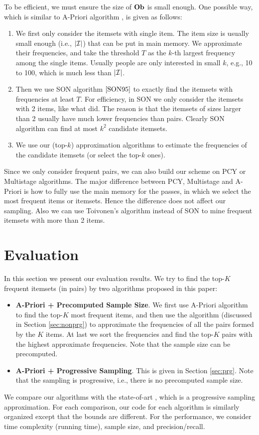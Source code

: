 \documentclass{article}
\begin{document}
To be efficient, we must ensure the size of $\mathbf{Ob}$ is small enough. One possible way, which is similar to A-Priori algorithm \cite{AIS93}, is given as follows:
\begin{enumerate}
\item We first only consider the itemsets with single item. The item size is usually small enough (i.e., $|\mathcal{I}|$) that can be put in main memory. We approximate their frequencies, and take the threshold $T$ as the $k$-th largest frequency among the single items. Usually people are only interested in small $k$, e.g., 10 to 100, which is much less than $|\mathcal{I}|$.
\item Then we use SON algorithm $\cite{SON95}$ to exactly find the itemsets with frequencies at least $T$. For efficiency, in SON we only consider the itemsets with 2 items, like what \cite{LRU14} did. The reason is that the itemsets of sizes larger than 2 usually have much lower frequencies than pairs. Clearly SON algorithm can find at most $k^2$ candidate itemsets.
\item We use our (top-$k$) approximation algorithms to estimate the frequencies of the candidate itemsets (or select the top-$k$ ones).
\end{enumerate}
Since we only consider frequent pairs, we can also build our scheme on PCY or Multistage algorithms. The major difference between PCY, Multistage and A-Priori is how to fully use the main memory for the passes, in which we select the most frequent items or itemsets. Hence the difference does not affect our sampling. Also we can use Toivonen's algorithm instead of SON to mine frequent itemsets with more than 2 items.

\section{Evaluation}
\label{sec:eval}
In this section we present our evaluation results. 
We try to find the top-$K$ frequent itemsets (in pairs) by two algorithms proposed in this paper:
\begin{itemize}
\item {\bf A-Priori + Precomputed Sample Size}. We first use A-Priori algorithm to find the top-$K$ most frequent items, and then use the algorithm (discussed in Section \ref{sec:nonprg}) to approximate the frequencies of all the pairs formed by the $K$ items. At last we sort the frequencies and find the top-$K$ pairs with the highest approximate frequencies. Note that the sample size can be precomputed.
\item {\bf A-Priori + Progressive Sampling}. This is given in Section \ref{sec:prg}. Note that the sampling is progressive, i.e., there is no precomputed sample size.
\end{itemize}
We compare our algorithms with the state-of-art \cite{RU15}, which is a progressive sampling approximation. For each comparison, our code for each algorithm is similarly organized except that the bounds are different. 
For the performance, we consider time complexity (running time), sample size, and precision/recall.
\end{document}
